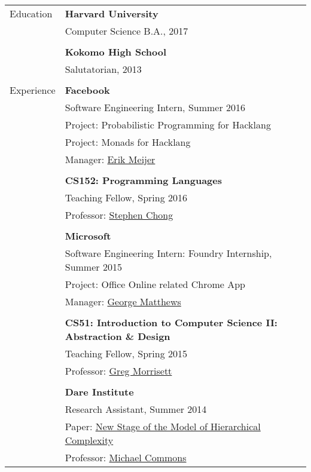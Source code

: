 \documentclass[letterpaper,11pt,oneside]{article}
\begin{document}
\noindent \begin{tabular}{@{} l l}
 \Large{Education}    & \textbf{Harvard University} \\
     & Computer Science B.A., 2017 \\
     & \\
     & \textbf{Kokomo High School} \\
     & Salutatorian, 2013 \\
     & \\
 \Large{Experience}    & \textbf{Facebook} \\
     & Software Engineering Intern, Summer 2016 \\
     & Project: Probabilistic Programming for Hacklang \\
     & Project: Monads for Hacklang \\
     & Manager: \href{https://www.linkedin.com/in/erikmeijer1}{Erik Meijer} \\
     & \\
     & \textbf{CS152: Programming Languages} \\
     & Teaching Fellow, Spring 2016 \\
     & Professor: \href{http://people.seas.harvard.edu/~chong/}{Stephen Chong} \\ 
     & \\ 
     & \textbf{Microsoft} \\
     & Software Engineering Intern: Foundry Internship, Summer 2015 \\
     & Project: Office Online related Chrome App \\
     & Manager: \href{https://www.linkedin.com/in/gfmatthews}{George Matthews} \\
     & \\
     & \textbf{CS51: Introduction to Computer Science II: Abstraction \& Design}  \\
     & Teaching Fellow, Spring 2015 \\
     & Professor: \href{http://www.cs.cornell.edu/~jgm/}{Greg Morrisett} \\
     & \\
     & \textbf{Dare Institute} \\
     & Research Assistant, Summer 2014 \\
     & Paper: \href{http://psycnet.apa.org/journals/bdb/19/3/1.html}{New Stage of the Model of Hierarchical Complexity} \\
     & Professor: \href{https://www.linkedin.com/in/michael-lamport-commons-5325955}{Michael Commons} \\

\end{tabular}
\end{document}
